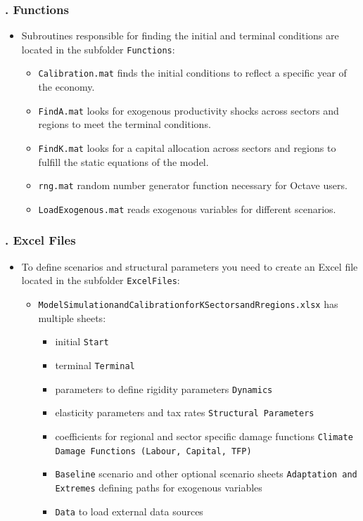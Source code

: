 \documentclass[11pt,aspectratio=169]{beamer}
\begin{document}
\begin{frame}[plain]
\frametitle{{\thesection.\thesubsection} Functions}
\begin{itemize}
\item Subroutines responsible for finding the initial and terminal conditions are located in the subfolder {\tt Functions}:
\begin{itemize}
\item {\tt Calibration.mat} finds the initial conditions to reflect a specific year of the economy.
\item {\tt FindA.mat} looks for exogenous productivity shocks across sectors and regions to meet the terminal conditions.
\item {\tt FindK.mat} looks for a capital allocation across sectors and regions to fulfill the static equations of the model.
\item {\tt rng.mat} random number generator function necessary for Octave users.
\item {\tt LoadExogenous.mat} reads exogenous variables for different scenarios.
\end{itemize}
\end{itemize}
\end{frame}

\begin{frame}[plain]
\frametitle{{\thesection.\thesubsection} Excel Files}
\begin{itemize}
\item To define scenarios and structural parameters you need to create an Excel file located in the subfolder {\tt ExcelFiles}:
\begin{itemize}
\item {\tt ModelSimulationandCalibrationforKSectorsandRregions.xlsx} has multiple sheets:
\begin{itemize}
\item initial {\tt Start}
\item terminal {\tt Terminal}
\item parameters to define rigidity parameters {\tt Dynamics}
\item elasticity parameters and tax rates {\tt Structural Parameters}
\item coefficients for regional and sector specific damage functions {\tt Climate Damage Functions (Labour, Capital, TFP)}
\item {\tt Baseline} scenario and other optional scenario sheets {\tt Adaptation and Extremes} defining paths for exogenous variables 
\item {\tt Data} to load external data sources
\end{itemize}
\end{itemize}
\end{itemize}
\end{frame}
\end{document}
